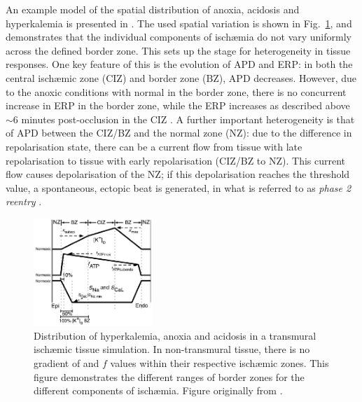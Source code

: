 \documentclass[../thesis-main.tex]{subfiles}
\begin{document}
 An example model of the spatial distribution of anoxia, acidosis and hyperkalemia is presented in \citet{Tice2007}. The used spatial variation is shown in Fig.~\ref{fig:spatial-ischaemia}, and demonstrates that the individual components of isch\ae mia do not vary uniformly across the defined border zone. This sets up the stage for heterogeneity in tissue responses. One key feature of this is the evolution of APD and ERP: in both the central isch\ae mic zone (CIZ) and border zone (BZ), APD decreases. However, due to the anoxic conditions with normal \ko{} in the border zone, there is no concurrent increase in ERP in the border zone, while the ERP increases as described above $\sim6$ minutes post-occlusion in the CIZ \citep{Tice2007, Coronel2012}. A further important heterogeneity is that of APD between the CIZ/BZ and the normal zone (NZ): due to the difference in repolarisation state, there can be a current flow from tissue with late repolarisation to tissue with early repolarisation (CIZ/BZ to NZ). This current flow causes depolarisation of the NZ; if this depolarisation reaches the threshold value, a spontaneous, ectopic beat is generated, in what is referred to as \emph{phase 2 reentry} \citep{Coronel2009, Lukas1996, Coronel2012}.
 \begin{figure}
  \centering
  \includegraphics[width=0.4\textwidth]{spatial-ischaemia}
  \caption[Distribution of isch\ae mic properties in tissue.]{Distribution of hyperkalemia, anoxia and acidosis in a transmural isch\ae mic tissue simulation. In non-transmural tissue, there is no gradient of \ko{} and $f$ values within their respective isch\ae mic zones. This figure demonstrates the different ranges of border zones for the different components of isch\ae mia. Figure originally from \citet{Tice2007}.}
  \label{fig:spatial-ischaemia}
 \end{figure}
 
\end{document}
